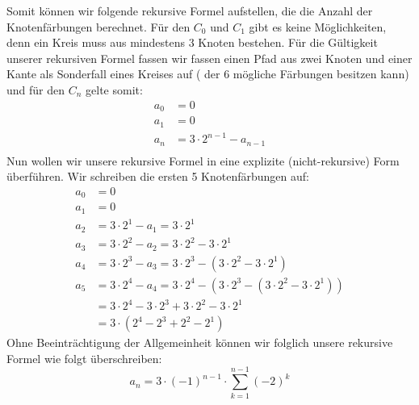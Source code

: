      Somit können wir folgende rekursive Formel aufstellen, die die Anzahl der Knotenfärbungen 
     berechnet. Für den $C_0$  und $C_1$ gibt es keine Möglichkeiten, denn ein Kreis muss aus mindestens 3 Knoten bestehen. Für die Gültigkeit unserer rekursiven Formel fassen wir fassen einen Pfad aus zwei Knoten und einer Kante als Sonderfall eines Kreises auf ( der 6 mögliche Färbungen besitzen kann) und für den $C_n$ gelte somit: 
     \begin{align*} 
     a_0 &= 0 \\ 
     a_1 &= 0  \\
     a_n &= 3\cdot 2^{n-1} - a_{n-1}\\ 
     \end{align*}
     Nun wollen wir unsere rekursive Formel in eine explizite (nicht-rekursive) Form überführen. Wir schreiben die ersten 5 Knotenfärbungen auf:
     \begin{align*}
          a_0 &= 0\\
          a_1 &= 0\\
          a_2 &= 3\cdot 2^1 - a_1 = 3\cdot 2^1\\
          a_3 &= 3\cdot 2^2 - a_2 = 3\cdot 2^2 - 3\cdot 2^1\\
          a_4 &= 3\cdot 2^3 - a_3 = 3\cdot 2^3 - (3\cdot 2^2 - 3\cdot 2^1)\\
          a_5 &= 3\cdot 2^4 - a_4 = 3\cdot 2^4 - (3\cdot 2^3 - (3\cdot 2^2 - 3\cdot 2^1))\\
          &= 3\cdot 2^4 - 3\cdot 2^3 + 3\cdot 2^2 - 3\cdot 2^1\\
          &= 3\cdot (2^4 - 2^3 + 2^2 - 2^1)
        \end{align*} 
     Ohne Beeinträchtigung der Allgemeinheit können wir folglich unsere rekursive Formel wie folgt überschreiben:
     $$ a_n = 3 \cdot (-1)^{n-1} \cdot \sum_{k=1}^{n-1}(-2)^k$$
